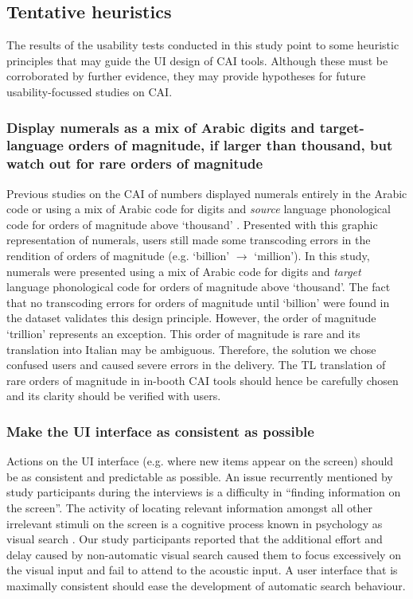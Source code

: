 \subsection{Tentative heuristics}

The results of the usability tests conducted in this study point to some heuristic principles that may guide the UI design of CAI tools. Although these must be corroborated by further evidence, they may provide hypotheses for future usability-focussed studies on CAI.


\subsubsection{Display numerals as a mix of Arabic digits and target-language orders of magnitude, if larger than thousand, but watch out for rare orders of magnitude}

Previous studies on the CAI of numbers displayed numerals entirely in the Arabic code or using a mix of Arabic code for digits and \textit{source} language phonological code for orders of magnitude above ‘thousand’ \citep{canali2019technologie,pisani2021measuring}. Presented with this graphic representation of numerals, users still made some transcoding errors in the rendition of orders of magnitude (e.g. ‘billion’ $\longrightarrow$ ‘million’). In this study, numerals were presented using a mix of Arabic code for digits and \textit{target} language phonological code for orders of magnitude above ‘thousand’. The fact that no transcoding errors for orders of magnitude until ‘billion’ were found in the dataset validates this design principle. However, the order of magnitude ‘trillion’ represents an exception. This order of magnitude is rare and its translation into Italian may be ambiguous. Therefore, the solution we chose confused users and caused severe errors in the delivery. The TL translation of rare orders of magnitude in in-booth CAI tools should hence be carefully chosen and its clarity should be verified with users.

\subsubsection{Make the UI interface as consistent as possible}

Actions on the UI interface (e.g. where new items appear on the screen) should be as consistent and predictable as possible. An issue recurrently mentioned by study participants during the interviews is a difficulty in ``finding information on the screen''. The activity of locating relevant information amongst all other irrelevant stimuli on the screen is a cognitive process known in psychology as visual search \citep{davis2004visual}. Our study participants reported that the additional effort and delay caused by non-automatic visual search caused them to focus excessively on the visual input and fail to attend to the acoustic input. A user interface that is maximally consistent should ease the development of automatic search behaviour.



